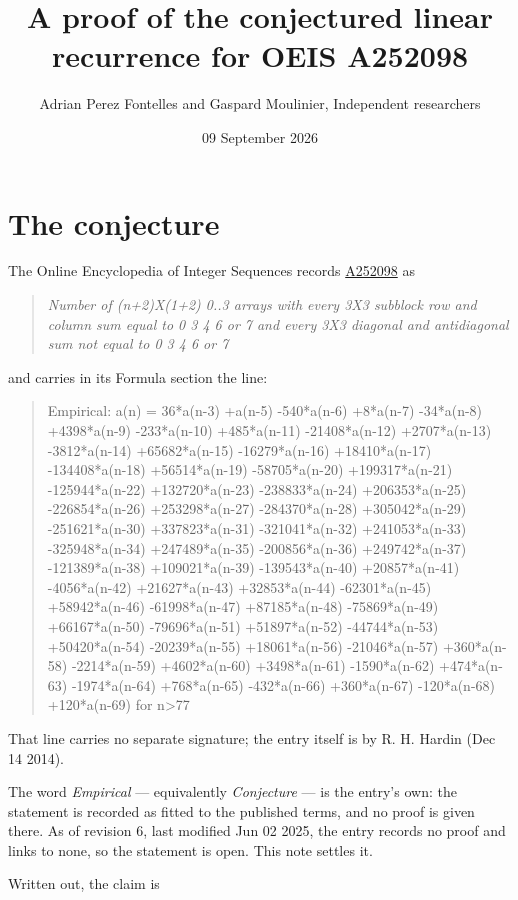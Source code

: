 \documentclass[11pt]{article}
\title{A proof of the conjectured linear recurrence for OEIS A252098}
\author{Adrian Perez Fontelles and Gaspard Moulinier, Independent researchers}
\date{09 September 2026}
\theoremstyle{definition}
\begin{document}
\maketitle
\section{The conjecture}

The Online Encyclopedia of Integer Sequences records \href{https://oeis.org/A252098}{A252098} as

\begin{quote}\itshape Number of (n+2)X(1+2) 0..3 arrays with every 3X3 subblock row and column sum equal to 0 3 4 6 or 7 and every 3X3 diagonal and antidiagonal sum not equal to 0 3 4 6 or 7\end{quote}

and carries in its Formula section the line:

\begin{quote}\ttfamily Empirical: a(n) = 36*a(n-3) +a(n-5) -540*a(n-6) +8*a(n-7) -34*a(n-8) +4398*a(n-9) -233*a(n-10) +485*a(n-11) -21408*a(n-12) +2707*a(n-13) -3812*a(n-14) +65682*a(n-15) -16279*a(n-16) +18410*a(n-17) -134408*a(n-18) +56514*a(n-19) -58705*a(n-20) +199317*a(n-21) -125944*a(n-22) +132720*a(n-23) -238833*a(n-24) +206353*a(n-25) -226854*a(n-26) +253298*a(n-27) -284370*a(n-28) +305042*a(n-29) -251621*a(n-30) +337823*a(n-31) -321041*a(n-32) +241053*a(n-33) -325948*a(n-34) +247489*a(n-35) -200856*a(n-36) +249742*a(n-37) -121389*a(n-38) +109021*a(n-39) -139543*a(n-40) +20857*a(n-41) -4056*a(n-42) +21627*a(n-43) +32853*a(n-44) -62301*a(n-45) +58942*a(n-46) -61998*a(n-47) +87185*a(n-48) -75869*a(n-49) +66167*a(n-50) -79696*a(n-51) +51897*a(n-52) -44744*a(n-53) +50420*a(n-54) -20239*a(n-55) +18061*a(n-56) -21046*a(n-57) +360*a(n-58) -2214*a(n-59) +4602*a(n-60) +3498*a(n-61) -1590*a(n-62) +474*a(n-63) -1974*a(n-64) +768*a(n-65) -432*a(n-66) +360*a(n-67) -120*a(n-68) +120*a(n-69) for n>77\end{quote}

That line carries no separate signature; the entry itself is by R. H. Hardin (Dec 14 2014).

The word {\itshape Empirical} --- equivalently {\itshape Conjecture} --- is the entry's own: the statement is recorded as fitted to the published terms, and no proof is given there. As of revision 6, last modified Jun 02 2025, the entry records no proof and links to none, so the statement is open. This note settles it.

Written out, the claim is
\end{document}
